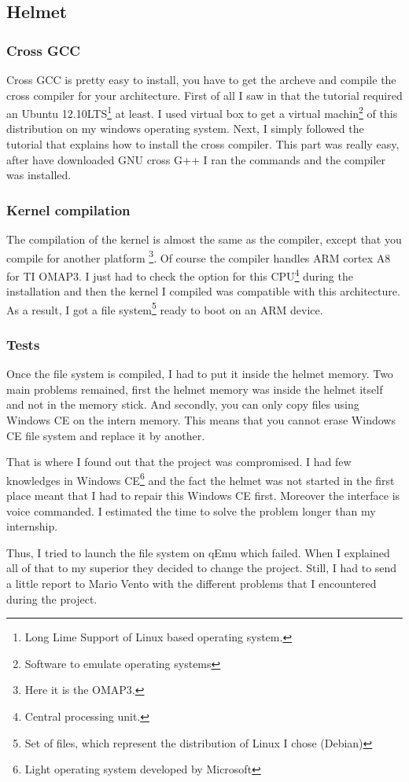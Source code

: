 	\subsection{Helmet}
	\subsubsection{Cross GCC}
	
	\par Cross GCC is pretty easy to install, you have to get the archeve and compile the cross compiler for your architecture. First of all I saw in that the tutorial required an Ubuntu 12.10LTS\footnote{Long Lime Support of Linux based operating system.} at least. I used virtual box to get a virtual machin\footnote{Software to emulate operating systems} of this distribution on my windows operating system. Next, I simply followed the tutorial that explains how to install the cross compiler. This part was really easy, after have downloaded GNU cross G++ I ran the commands and the compiler was installed.
	
	\subsubsection{Kernel compilation}
	
	\par The compilation of the kernel is almost the same as the compiler, except that you compile for another platform \footnote{Here it is the OMAP3.}. Of course the compiler handles ARM cortex A8 for TI OMAP3. I just had to check the option for this CPU\footnote{Central processing unit.} during the installation and then the kernel I compiled was compatible with this architecture. As a result, I got a file system\footnote{Set of files, which represent the distribution of Linux I chose (Debian)}  ready to boot on an ARM device.
	
	
	\subsubsection{Tests}
	
	\par Once the file system is compiled, I had to put it inside the helmet memory. Two main problems remained, first the helmet memory was inside the helmet itself and not in the memory stick. And secondly, you can only copy files using Windows CE on the intern memory. This means that you cannot erase Windows CE file system and replace it by another.
	\par That is where I found out that the project was compromised. I had few knowledges in Windows CE\footnote{Light operating system developed by Microsoft} and the fact the helmet was not started in the first place meant that I had to repair this Windows CE first. Moreover the interface is voice commanded. I estimated the time to solve the problem longer than my internship.
	\par Thus, I tried to launch the file system on qEmu which failed. When I explained all of that to my superior they decided to change the project. Still, I had to send a little report to Mario Vento with the different problems that I encountered during the project.
	
